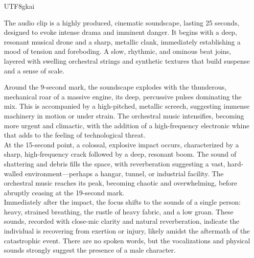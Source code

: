 \begin{CJK*}{UTF8}{gkai}

\begin{tcolorbox}[
    colback=lightgray,
    colframe=black,
    boxrule=2pt,
    sharp corners,
    width=\textwidth,
    title={Analysis of Complex Scene Sound Effect},
    colbacktitle=black,
    coltitle=white,
    fonttitle=\bfseries\sffamily,
    halign title=center,
]
\ttfamily
The audio clip is a highly produced, cinematic soundscape, lasting 25 seconds, designed to evoke intense drama and imminent danger. It begins with a deep, resonant musical drone and a sharp, metallic clank, immediately establishing a mood of tension and foreboding. A slow, rhythmic, and ominous beat joins, layered with swelling orchestral strings and synthetic textures that build suspense and a sense of scale.\par


Around the 9-second mark, the soundscape explodes with the thunderous, mechanical roar of a massive engine, its deep, percussive pulses dominating the mix. This is accompanied by a high-pitched, metallic screech, suggesting immense machinery in motion or under strain. The orchestral music intensifies, becoming more urgent and climactic, with the addition of a high-frequency electronic whine that adds to the feeling of technological threat.\\



At the 15-second point, a colossal, explosive impact occurs, characterized by a sharp, high-frequency crack followed by a deep, resonant boom. The sound of shattering and debris fills the space, with reverberation suggesting a vast, hard-walled environment—perhaps a hangar, tunnel, or industrial facility. The orchestral music reaches its peak, becoming chaotic and overwhelming, before abruptly ceasing at the 19-second mark.\\


Immediately after the impact, the focus shifts to the sounds of a single person: heavy, strained breathing, the rustle of heavy fabric, and a low groan. These sounds, recorded with close-mic clarity and natural reverberation, indicate the individual is recovering from exertion or injury, likely amidst the aftermath of the catastrophic event. There are no spoken words, but the vocalizations and physical sounds strongly suggest the presence of a male character.\\


\end{tcolorbox}
\end{CJK*}
